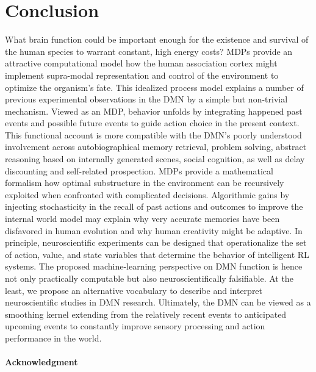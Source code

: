 \documentclass[10pt,letterpaper]{article}
\begin{document}
\section{Conclusion}
What brain function could be important enough
for the existence and survival of the human species
to warrant constant, high energy costs?
MDPs provide an attractive
computational model how the human association cortex
might implement supra-modal representation and control of the environment to
optimize the organism's fate.
This idealized process model explains
a number of previous experimental observations in the
DMN by a simple but non-trivial mechanism.
%
Viewed as an MDP, behavior unfolds by integrating happened past events
and possible future events to guide action choice in the present context.
This functional account is more compatible with the DMN's
poorly understood involvement across
autobiographical memory retrieval, problem solving,
abstract reasoning based on internally generated scenes, social cognition,
as well as delay discounting and self-related prospection.
MDPs provide a mathematical formalism how
optimal substructure in the environment can be recursively exploited
when confronted with complicated decisions.
Algorithmic gains by injecting stochasticity in the recall of past
actions and outcomes to improve the internal world model may explain why
very accurate memories have been disfavored in human evolution
and why human creativity might be adaptive.
%
In principle,
neuroscientific experiments can be designed that operationalize
the set of action, value, and state variables that determine
the behavior of intelligent RL systems.
The proposed machine-learning perspective
on DMN function is hence not only practically computable but
also neuroscientifically falsifiable.
At the least, we propose an alternative vocabulary to
describe and interpret neuroscientific studies in DMN research.
%
Ultimately,
the DMN can be viewed as a smoothing kernel extending
from the relatively recent events to anticipated upcoming events
to constantly improve sensory processing and
action performance in the world.



\paragraph{Acknowledgment}


\small
% 
% 


\end{document}
